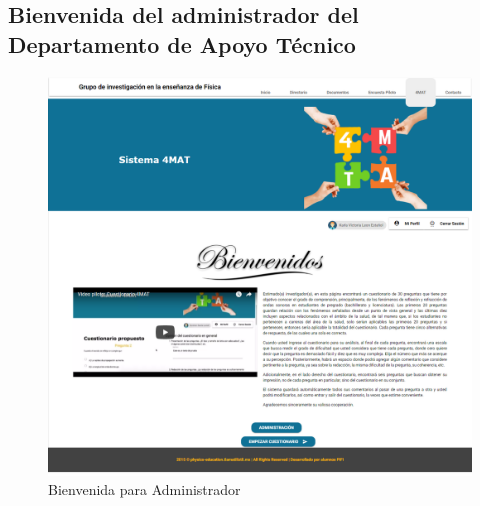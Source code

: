 \subsection{Bienvenida del administrador del Departamento de 
	Apoyo Técnico}


	\begin{figure}[hbtp]
		\centering
		\includegraphics[scale=0.3]{images/Interfaz/IUGS01_binevenida.png}
		\caption{Bienvenida para Administrador}
	\end{figure}
	